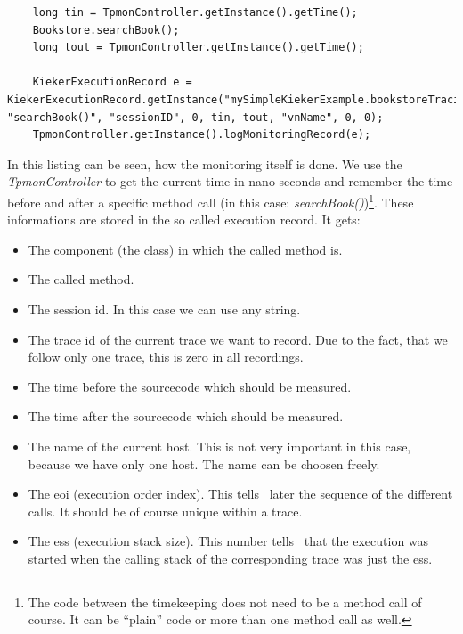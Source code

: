       \lstset{caption=Cutting from Bookstore.java, label=listing:cuttingBookstore}
      \begin{lstlisting}
	long tin = TpmonController.getInstance().getTime();
	Bookstore.searchBook();
	long tout = TpmonController.getInstance().getTime();

	KiekerExecutionRecord e = KiekerExecutionRecord.getInstance("mySimpleKiekerExample.bookstoreTracing.Bookstore", "searchBook()", "sessionID", 0, tin, tout, "vnName", 0, 0);
	TpmonController.getInstance().logMonitoringRecord(e);
      \end{lstlisting}
      In this listing can be seen, how the monitoring itself is done. We use the \textit{TpmonController} to get the current time in nano seconds and remember the time before and after a specific method call (in this case: \textit{searchBook()})\footnote{The code between the timekeeping does not need to be a method call of course. It can be ``plain'' code or more than one method call as well.}. These informations are stored in the so called execution record. It gets:
      \begin{itemize}
	\item The component (the class) in which the called method is.
	\item The called method.
	\item The session id. In this case we can use any string.
	\item The trace id of the current trace we want to record. Due to the fact, that we follow only one trace, this is zero in all recordings.
	\item The time before the sourcecode which should be measured.
	\item The time after the sourcecode which should be measured.
	\item The name of the current host. This is not very important in this case, because we have only one host. The name can be choosen freely.
	\item The eoi (execution order index). This tells \Kieker\ later the sequence of the different calls. It should be of course unique within a trace.
	\item The ess (execution stack size). This number tells \Kieker\ that the execution was started when the calling stack of the corresponding trace was just the                
              ess.
      \end{itemize}

